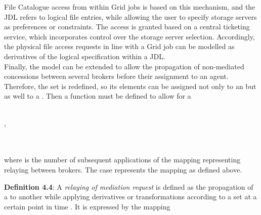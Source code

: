 \documentclass[10pt]{iopart}
\begin{document}
File Catalogue access from within Grid jobs is based on this mechanism, and the 
JDL refers to logical file entries,
while allowing the user to specify storage servers as preferences or
constraints. The access is granted based on a central ticketing service, which 
incorporates control over the storage server selection. Accordingly, the
physical file access requests in line with a Grid job can be modelled as
derivatives of the logical specification within a JDL.\\
Finally, the model can be extended to allow the propagation of
non-mediated concessions between several brokers before their assignment to an agent.
Therefore, the set  is
redefined, so its elements can be assigned not only to an   but as
well to a . Then a function  must be defined to
allow for a\\\\
\centerline{\;\;,}\\\\
where  is the
number of subsequent applications of the mapping
 representing relaying between brokers. The case  represents the
mapping   as defined above.\\
\par
\begingroup
\leftskip=0.4cm \noindent
\textbf{Definition 4.4}: A \textit{relaying of mediation request} is defined as
the propagation of a  to another  while applying
derivatives or transformations according to a set  at a certain point in time
. It is expressed by the mapping
\par
\endgroup\noindent
\begin{center}

\end{center}
 
\end{document}
